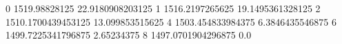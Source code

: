 0 1519.98828125 22.9180908203125
1 1516.2197265625 19.1495361328125
2 1510.1700439453125 13.099853515625
4 1503.454833984375 6.3846435546875
6 1499.7225341796875 2.65234375
8 1497.0701904296875 0.0
